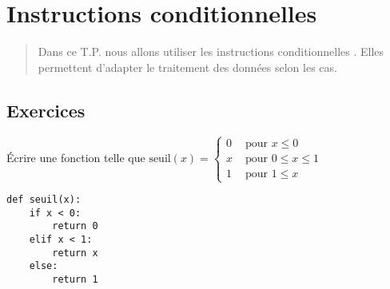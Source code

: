 \chapter{Instructions conditionnelles}
\thispagestyle{empty}
\begin{abstract} Dans ce T.P. nous allons utiliser les instructions conditionnelles . Elles permettent d'adapter le traitement des données selon les cas.
\end{abstract}
\section{Exercices}
\begin{Exercise}Écrire une fonction  telle que
$\displaystyle\text{seuil}(x) = \left\{\begin{matrix} 0&\text{ pour }x \le 0\\
x&\text{ pour }0\le x \le 1\\
1&\text{ pour }1\le x 
\end{matrix}
\right.$
\begin{center}
\end{center}
\end{Exercise}
\begin{Answer}
\begin{lstlisting}
def seuil(x):
    if x < 0:
        return 0
    elif x < 1:
        return x
    else:
        return 1
\end{lstlisting}
\end{Answer}


